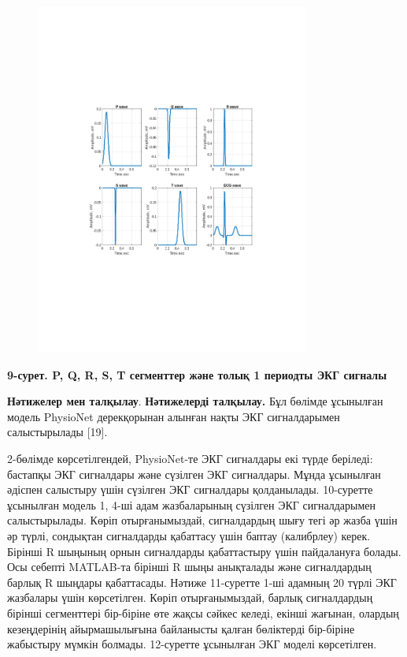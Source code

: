 {\begin{figure}[H]
	\centering
	\includegraphics[width=0.8\textwidth]{media/ict/image49}
	\caption*{}
\end{figure}


{\bfseries 9-сурет. P, Q, R, S, T сегменттер және толық 1 периодты ЭКГ
сигналы}

{\bfseries Нәтижелер мен талқылау}. {\bfseries Нәтижелерді талқылау.} Бұл
бөлімде ұсынылған модель PhysioNet дерекқорынан алынған нақты ЭКГ
сигналдарымен салыстырылады {[}19{]}.

2-бөлімде көрсетілгендей, PhysioNet-те ЭКГ сигналдары екі түрде
беріледі: бастапқы ЭКГ сигналдары және сүзілген ЭКГ сигналдары. Мұнда
ұсынылған әдіспен салыстыру үшін сүзілген ЭКГ сигналдары қолданылады.
10-суретте ұсынылған модель 1, 4-ші адам жазбаларының сүзілген ЭКГ
сигналдарымен салыстырылады. Көріп отырғанымыздай, сигналдардың шығу
тегі әр жазба үшін әр түрлі, сондықтан сигналдарды қабаттасу үшін баптау
(калибрлеу) керек. Бірінші R шыңының орнын сигналдарды қабаттастыру үшін
пайдалануға болады. Осы себепті MATLAB-та бірінші R шыңы анықталады және
сигналдардың барлық R шыңдары қабаттасады. Нәтиже 11-суретте 1-ші
адамның 20 түрлі ЭКГ жазбалары үшін көрсетілген. Көріп отырғанымыздай,
барлық сигналдардың бірінші сегменттері бір-біріне өте жақсы сәйкес
келеді, екінші жағынан, олардың кезеңдерінің айырмашылығына байланысты
қалған бөліктерді бір-біріне жабыстыру мүмкін болмады. 12-суретте
ұсынылған ЭКГ моделі көрсетілген.

}

